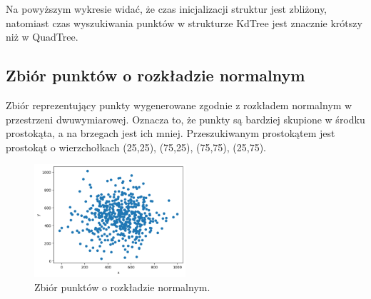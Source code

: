 \documentclass{lab}
\begin{document}
Na powyższym wykresie widać, że czas inicjalizacji struktur jest zbliżony, natomiast czas wyszukiwania punktów w strukturze KdTree jest znacznie krótszy niż w QuadTree.

\newpage
\subsection{Zbiór punktów o rozkładzie normalnym}
Zbiór reprezentujący punkty wygenerowane zgodnie z rozkładem normalnym w przestrzeni dwuwymiarowej.
Oznacza to, że punkty są bardziej skupione w środku prostokąta, a na brzegach jest ich mniej.
Przeszukiwanym prostokątem jest prostokąt o wierzchołkach (25,25), (75,25), (75,75), (25,75).

\begin{figure}[H]
  \centering
  \includegraphics[width=0.5\textwidth]{resources/normal.png}
  \caption{Zbiór punktów o rozkładzie normalnym.}
  \label{fig:normal}
\end{figure}
\end{document}
